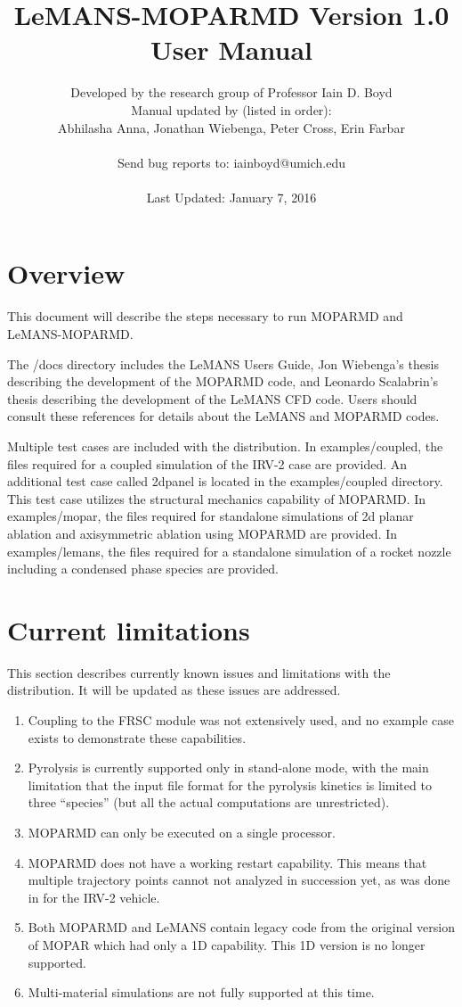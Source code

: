 \documentclass[]{article}
\title{\Large LeMANS-MOPARMD Version 1.0 User Manual}
\date{}
\author{Developed by the research group of Professor Iain D. Boyd \\ 
				Manual updated by (listed in order):\\
				Abhilasha Anna, Jonathan Wiebenga, Peter Cross, Erin Farbar\\
				\\
				Send bug reports to: iainboyd@umich.edu \\
				\\
				Last Updated: January 7, 2016}
\date{}
\begin{document}
    
\maketitle

\tableofcontents

\section{Overview}
This document will describe the steps necessary to run MOPARMD and LeMANS-MOPARMD. 

The /docs directory includes the LeMANS Users Guide, Jon Wiebenga's thesis describing the development of the MOPARMD code, and Leonardo Scalabrin's thesis describing the development of the LeMANS CFD code.  Users should consult these references for details about the LeMANS and MOPARMD codes.

Multiple test cases are included with the distribution.  In examples/coupled, the files required for a coupled simulation of the IRV-2 case are provided.  An additional test case called 2dpanel is located in the examples/coupled directory.  This test case utilizes the structural mechanics capability of MOPARMD.  In examples/mopar, the files required for standalone simulations of 2d planar ablation and axisymmetric ablation using MOPARMD are provided. In examples/lemans, the files required for a standalone simulation of a rocket nozzle including a condensed phase species are provided.

\section{Current limitations}\label{sec:limitations}
This section describes currently known issues and limitations with the distribution.  It will be updated as these issues are addressed.

\begin{enumerate}
 \item Coupling to the FRSC module was not extensively used, and no example case exists to demonstrate these capabilities.
 \item Pyrolysis is currently supported only in stand-alone mode, with the main limitation that the input file format for the pyrolysis kinetics is limited to three ``species'' (but all the actual computations are unrestricted).
 \item MOPARMD can only be executed on a single processor.
 \item MOPARMD does not have a working restart capability.  This means that multiple trajectory points cannot not analyzed in succession yet, as was done in \cite{kuntz} for the IRV-2 vehicle.
 \item Both MOPARMD and LeMANS contain legacy code from the original version of MOPAR which had only a 1D capability.  This 1D version is no longer supported.
 \item Multi-material simulations are not fully supported at this time.
\end{enumerate}
\end{document}
